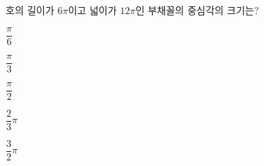 호의 길이가 $6\pi$이고 넓이가 $12\pi$인 부채꼴의 중심각의 크기는?
\begin{choices32}{\rule[-3ex]{0pt}{8ex}$\dfrac{\pi}{6}$}{\rule[-3ex]{0pt}{8ex}$\dfrac{\pi}{3}$}{\rule[-3ex]{0pt}{8ex}$\dfrac{\pi}{2}$}{\rule[-3ex]{0pt}{8ex}$\dfrac{2}{3}\pi$}{\rule[-3ex]{0pt}{8ex}$\dfrac{3}{2}\pi$}\end{choices32}
